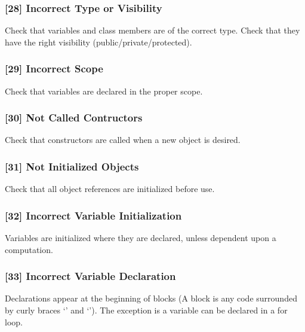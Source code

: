 \subsubsection{[28] Incorrect Type or Visibility}
Check that variables and class members are of the correct type. Check that they have the right visibility (public/private/protected).
\subsubsection{[29] Incorrect Scope}
Check that variables are declared in the proper scope.
\subsubsection{[30] Not Called Contructors}
Check that constructors are called when a new object is desired.
\subsubsection{[31] Not Initialized Objects}
Check that all object references are initialized before use.
\subsubsection{[32] Incorrect Variable Initialization}
Variables are initialized where they are declared, unless dependent upon a computation.
\subsubsection{[33] Incorrect Variable Declaration}
Declarations appear at the beginning of blocks (A block is any code surrounded by curly braces ‘{’ and ‘}’). The exception is a variable can be declared in a for loop.